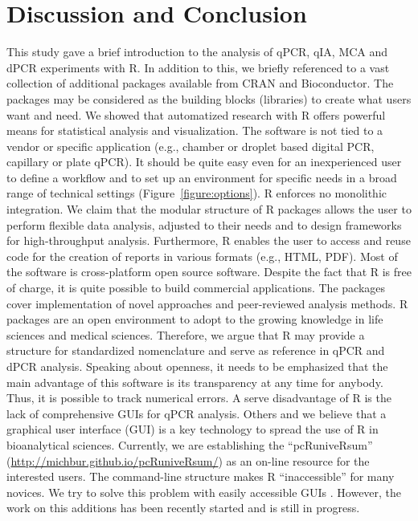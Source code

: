 \section{Discussion and Conclusion}

This study gave a brief introduction to the analysis of qPCR, qIA, MCA and dPCR 
experiments with R. In addition to this, we briefly referenced to a vast 
collection of 
additional packages available from CRAN and Bioconductor. The packages may be 
considered as the building blocks (libraries) to create what users want and 
need. We 
showed that automatized research with R offers powerful means for statistical 
analysis and visualization. The software is not tied to a vendor or specific 
application (e.g., chamber or droplet based digital PCR, capillary or plate 
qPCR). It should be quite easy even for an inexperienced user to define a 
workflow and to set up an environment for specific needs in a broad range of 
technical settings (Figure~\ref{figure:options}). R enforces no monolithic 
integration. We claim that the modular structure of R packages allows the user 
to 
perform flexible data analysis, adjusted to their needs and to design 
frameworks 
for high-throughput analysis. Furthermore, R enables the user to access and 
reuse code for the creation 
of reports in various formats (e.g., HTML, PDF). Most of the software is 
cross-platform open source software. Despite the fact that R is free of charge, 
it is quite possible to build commercial applications. The packages cover 
implementation of novel approaches and peer-reviewed analysis methods. R 
packages are an open environment to adopt to the growing knowledge in life 
sciences and medical sciences. Therefore, we argue that R may provide a 
structure for standardized nomenclature and serve as reference in qPCR and dPCR 
analysis. Speaking about openness, it needs to be emphasized that the main 
advantage of this software is its transparency at any time for anybody. Thus, 
it is 
possible to track numerical errors.  A serve disadvantage of R is the lack of 
comprehensive GUIs for qPCR analysis. Others and we believe that a graphical 
user 
interface (GUI) is a key technology to spread the use of R in bioanalytical 
sciences. Currently, we are establishing the ``pcRuniveRsum'' 
(\url{http://michbur.github.io/pcRuniveRsum/}) as an on-line resource for the
interested users. The command-line structure makes R ``inaccessible'' for many 
novices. We try to solve this problem with easily accessible 
GUIs \citep{rodiger_rkward_2012}. However, the work on this additions has been 
recently started and is still in progress.

